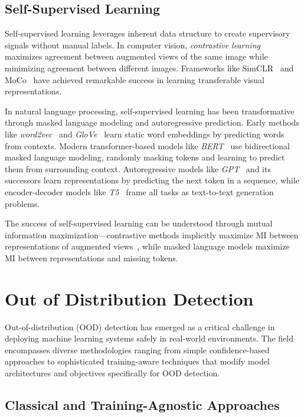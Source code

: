 \documentclass[11pt, oneside]{book}
\theoremstyle{plain}
\theoremstyle{definition}
\theoremstyle{remark}
\begin{document}
\subsection{Self-Supervised Learning}

Self-supervised learning leverages inherent data structure to create supervisory signals without manual labels. In computer vision, \emph{contrastive learning}~\citep{chen2020simple,he2020momentum} maximizes agreement between augmented views of the same image while minimizing agreement between different images. Frameworks like SimCLR~\citep{chen2020simple} and MoCo~\citep{he2020momentum} have achieved remarkable success in learning transferable visual representations.

In natural language processing, self-supervised learning has been transformative through masked language modeling and autoregressive prediction. Early methods like \emph{word2vec}~\citep{mikolov2013efficient} and \emph{GloVe}~\citep{pennington2014glove} learn static word embeddings by predicting words from contexts. Modern transformer-based models like \emph{BERT}~\citep{devlin2018bert} use bidirectional masked language modeling, randomly masking tokens and learning to predict them from surrounding context. Autoregressive models like \emph{GPT}~\citep{radford2018improving} and its successors learn representations by predicting the next token in a sequence, while encoder-decoder models like \emph{T5}~\citep{raffel2020exploring} frame all tasks as text-to-text generation problems.

The success of self-supervised learning can be understood through mutual information maximization—contrastive methods implicitly maximize MI between representations of augmented views~\citep{oord2018representation,hjelm2019learning}, while masked language models maximize MI between representations and missing tokens.

\section{Out of Distribution Detection}

Out-of-distribution (OOD) detection has emerged as a critical challenge in deploying machine learning systems safely in real-world environments. The field encompasses diverse methodologies ranging from simple confidence-based approaches to sophisticated training-aware techniques that modify model architectures and objectives specifically for OOD detection.

\subsection{Classical and Training-Agnostic Approaches}
\end{document}

